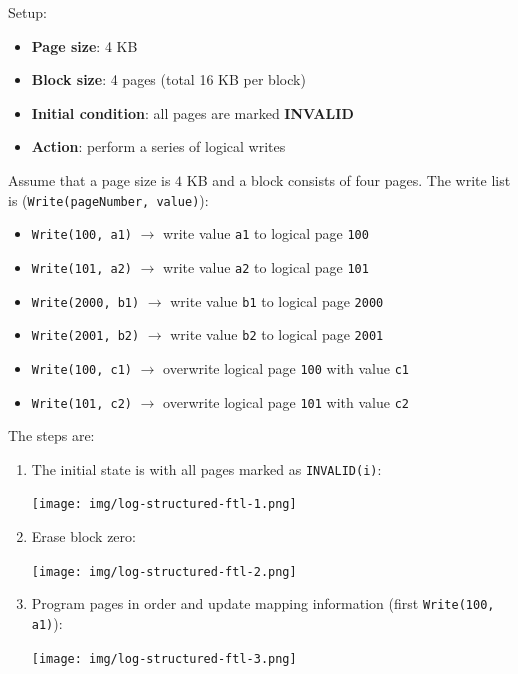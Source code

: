 \begin{examplebox}
    Setup:
    \begin{itemize}
        \item \textbf{Page size}: 4 KB
        \item \textbf{Block size}: 4 pages (total 16 KB per block)
        \item \textbf{Initial condition}: all pages are marked \textbf{INVALID}
        \item \textbf{Action}: perform a series of logical writes
    \end{itemize}
    Assume that a page size is $4$ KB and a block consists of four pages. The write list is (\texttt{Write(pageNumber, value)}):
    \begin{itemize}
        \item \texttt{Write(100, a1)}   $\rightarrow$ write value \texttt{a1} to logical page \texttt{100}
        \item \texttt{Write(101, a2)}   $\rightarrow$ write value \texttt{a2} to logical page \texttt{101}
        \item \texttt{Write(2000, b1)}  $\rightarrow$ write value \texttt{b1} to logical page \texttt{2000}
        \item \texttt{Write(2001, b2)}  $\rightarrow$ write value \texttt{b2} to logical page \texttt{2001}
        \item \texttt{Write(100, c1)}   $\rightarrow$ overwrite logical page \texttt{100} with value \texttt{c1}
        \item \texttt{Write(101, c2)}   $\rightarrow$ overwrite logical page \texttt{101} with value \texttt{c2}
    \end{itemize}
    The steps are:
    \begin{enumerate}
        \item The initial state is with all pages marked as \texttt{INVALID(i)}:
        \begin{center}
            \texttt{[image: img/log-structured-ftl-1.png]}
        \end{center}

        \item Erase block zero:
        \begin{center}
            \texttt{[image: img/log-structured-ftl-2.png]}
        \end{center}

        \item Program pages in order and update mapping information (first \texttt{Write(100, a1)}):
        \begin{center}
            \texttt{[image: img/log-structured-ftl-3.png]}
        \end{center}


\end{enumerate}
\end{examplebox}
